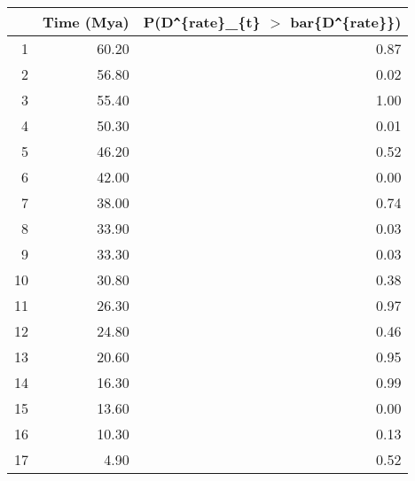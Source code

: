 \begin{table}[ht]
\centering
\begin{tabular}{rrr}
  \hline
 & Time (Mya) & P(D\verb|^|\{rate\}\_\{t\} $>$ bar\{D\verb|^|\{rate\}\}) \\ 
  \hline
1 & 60.20 & 0.87 \\ 
  2 & 56.80 & 0.02 \\ 
  3 & 55.40 & 1.00 \\ 
  4 & 50.30 & 0.01 \\ 
  5 & 46.20 & 0.52 \\ 
  6 & 42.00 & 0.00 \\ 
  7 & 38.00 & 0.74 \\ 
  8 & 33.90 & 0.03 \\ 
  9 & 33.30 & 0.03 \\ 
  10 & 30.80 & 0.38 \\ 
  11 & 26.30 & 0.97 \\ 
  12 & 24.80 & 0.46 \\ 
  13 & 20.60 & 0.95 \\ 
  14 & 16.30 & 0.99 \\ 
  15 & 13.60 & 0.00 \\ 
  16 & 10.30 & 0.13 \\ 
  17 & 4.90 & 0.52 \\ 
   \hline
\end{tabular}
\label{tab:rate_peak}
\end{table}
